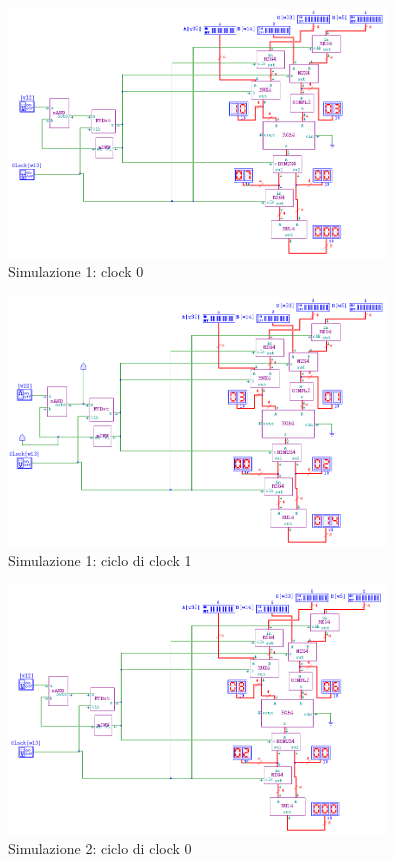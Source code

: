\documentclass[10pt]{article}
\begin{document}
\begin{itemize}
\begin{figure}[H]
    \begin{minipage}[c]{\textwidth}
    \centering    
    \includegraphics[width=100mm]{s1c0}
    \caption{Simulazione 1: clock 0}
    \label{ }
    \end{minipage}
\end{figure}

\begin{figure}[H]
    \begin{minipage}[c]{\textwidth}
    \centering
    \includegraphics[width=100mm]{s1c1}
    \caption{Simulazione 1: ciclo di clock 1}
    \label{ }
    \end{minipage}
\end{figure}

\begin{figure}[H]
    \begin{minipage}[c]{\textwidth}
    \centering
    \includegraphics[width=100mm]{s2c0}
    \caption{Simulazione 2: ciclo di clock 0}
    \label{ }
    \end{minipage}
\end{figure}


\end{itemize}
\end{document}
